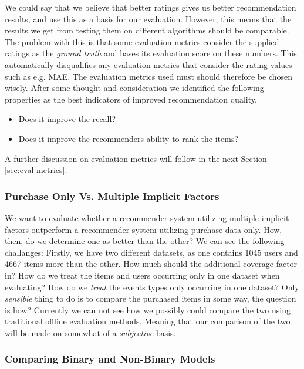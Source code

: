 We could say that we believe that better ratings gives us better recommendation results, and use this
as a basis for our evaluation. However, this means that the results we get from testing them
on different algorithms should be comparable. The problem with this is that some evaluation metrics
consider the supplied ratings as the \emph{ground truth} and bases its evaluation score on these numbers.
This automatically disqualifies any evaluation metrics that consider the rating values such as e.g. MAE.
The evaluation metrics used must should therefore be chosen wisely. After some thought and consideration
we identified the following properties as the best indicators of improved recommendation quality.

\begin{itemize}
\item Does it improve the recall?
\item Does it improve the recommenders ability to rank the items?
\end{itemize}

A further discussion on evaluation metrics will follow in the next Section \ref{sec:eval-metrics}.

\subsubsection{Purchase Only Vs. Multiple Implicit Factors}


We want to evaluate whether a recommender system utilizing multiple implicit factors outperform
a recommender system utilizing purchase data only.
How, then, do we determine one as better than the other? We can see the following challanges:
Firstly, we have two different datasets, as one contains 1045 users and 4667 items more than the
other. How much should the additional coverage factor in? How do we treat the items and users
occurring only in one dataset when evaluating? How do we \emph{treat} the events types only
occurring in one dataset? Only \emph{sensible} thing to do is to compare the purchased items
in some way, the question is how? Currently we can not see how we possibly could compare the
two using traditional offline evaluation methods. Meaning that our comparison of the two will
be made on somewhat of a \emph{subjective} basis.
	
\subsubsection{Comparing Binary and Non-Binary Models}

